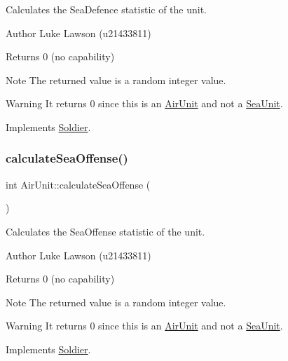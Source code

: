 Calculates the Sea\+Defence statistic of the unit. 

\begin{DoxyAuthor}{Author}
Luke Lawson (u21433811) 
\end{DoxyAuthor}
\begin{DoxyReturn}{Returns}
0 (no capability) 
\end{DoxyReturn}
\begin{DoxyNote}{Note}
The returned value is a random integer value. 
\end{DoxyNote}
\begin{DoxyWarning}{Warning}
It returns 0 since this is an \mbox{\hyperlink{class_air_unit}{Air\+Unit}} and not a \mbox{\hyperlink{class_sea_unit}{Sea\+Unit}}. 
\end{DoxyWarning}


Implements \mbox{\hyperlink{class_soldier_a6508d8539b427a9af01aabc07ba6ca8e}{Soldier}}.

\mbox{\label{class_air_unit_a1e0b1b7905336477733191c6a66cf022}} 
\subsubsection{\texorpdfstring{calculateSeaOffense()}{calculateSeaOffense()}}
{\footnotesize\ttfamily int Air\+Unit\+::calculate\+Sea\+Offense (\begin{DoxyParamCaption}{ }\end{DoxyParamCaption})\hspace{0.3cm}{\ttfamily [virtual]}}



Calculates the Sea\+Offense statistic of the unit. 

\begin{DoxyAuthor}{Author}
Luke Lawson (u21433811) 
\end{DoxyAuthor}
\begin{DoxyReturn}{Returns}
0 (no capability) 
\end{DoxyReturn}
\begin{DoxyNote}{Note}
The returned value is a random integer value. 
\end{DoxyNote}
\begin{DoxyWarning}{Warning}
It returns 0 since this is an \mbox{\hyperlink{class_air_unit}{Air\+Unit}} and not a \mbox{\hyperlink{class_sea_unit}{Sea\+Unit}}. 
\end{DoxyWarning}


Implements \mbox{\hyperlink{class_soldier_acdaf5453ea0f87b3219185b0a52dd869}{Soldier}}.


